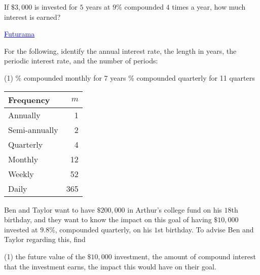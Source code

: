 \documentclass[../mathNotesPreamble]{subfiles}
\begin{document}
    \begin{ex*}
      If $\$3,000$ is invested for $5$ years at $9\%$ compounded $4$ times a year, how
much interest is earned?
    \end{ex*}
    \href{https://www.youtube.com/watch?v=g9Z4d5EOjGs}{\textcolor{blue}{\underline{Futurama}}}
    \pagebreak

    \noindent
    \begin{minipage}{0.74\linewidth}
      \begin{ex*}
        For the following, identify the annual interest rate, the length in years, the periodic interest rate, and the number of periods:
      \end{ex*}
      \begin{extasks}[after-item-skip=2\baselineskip](1)
        \% compounded monthly for 7 years
        \% compounded quarterly for 11 quarters
      \end{extasks}
      \vspace*{2\baselineskip}
    \end{minipage}%
    \begin{minipage}{0.225\linewidth}%
      \begin{tabular}{@{}lr@{}}\toprule
        Frequency& $m$\\\midrule
        Annually& 1\\
        Semi-annually& 2\\
        Quarterly& 4\\
        Monthly& 12\\
        Weekly& 52\\
        Daily& 365\\\bottomrule
      \end{tabular}
    \end{minipage}

  \begin{ex*}
    Ben and Taylor want to have $\$200,000$ in Arthur’s college fund on his
$18$th birthday, and they want to know the impact on this goal of
having $\$10,000$ invested at $9.8\%$, compounded quarterly, on his $1$st
birthday. To advise Ben and Taylor regarding this, find
    \begin{extasks}[after-item-skip=\stretch{1}](1)
      \task the future value of the $\$10,000$ investment,
      \task the amount of compound interest that the investment earns,
      \task the impact this would have on their goal.
    \end{extasks}
  \end{ex*}
  \pagebreak
\end{document}
